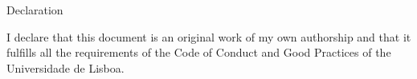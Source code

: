 
Declaration

I declare that this document is an original work of my own authorship and that it fulfills all the requirements of the Code of Conduct and Good Practices of the Universidade de Lisboa.
